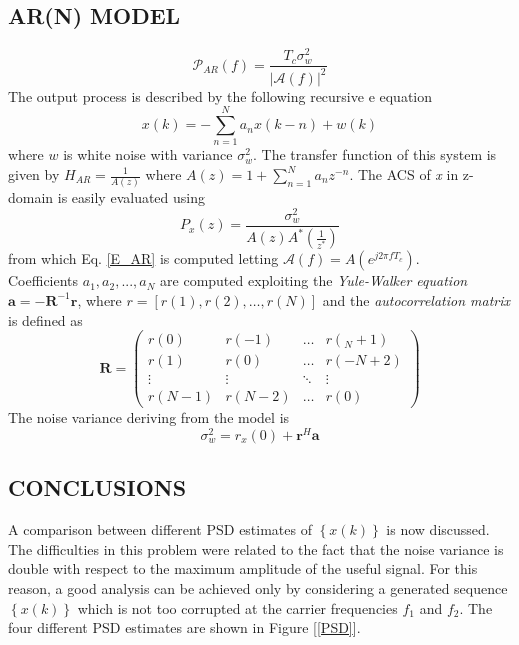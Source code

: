 \documentclass[a4paper,11pt,openright,twoside]{report}
\begin{document}
\subsection*{AR(N) MODEL}
\begin{equation}\label{E_AR}
\mathcal{P}_{AR}(f) = \frac{T_c \sigma_w^2}{\left | \mathcal{A}(f) \right |^2}
\end{equation}
The output process is described by the following recursive e equation
\begin{equation}\label{coeff}
x(k) = -\sum_{n=1}^{N} a_nx(k-n)+w(k)
\end{equation}
where $w$ is white noise with variance $\sigma_w^2$. The transfer function of this system is given by
$ H_{AR} = \frac{1}{A(z)} $ where $ A(z) = 1+\sum_{n=1}^Na_nz^{-n}$. The ACS of \textit{x} in z-domain is easily evaluated using 
\begin{equation*}
P_x(z) = \frac{\sigma_w^2}{A(z)A^*(\frac{1}{z^*})}
\end{equation*}
from which Eq. \ref{E_AR} is computed letting $\mathcal{A}(f) = A(e^{j2\pi f T_c})$. \\
Coefficients $a_1,a_2,...,a_N$ are computed exploiting the \textit{Yule-Walker equation}
 $\mathbf{a} = -\mathbf{R}^{-1}\mathbf{r}$, where $ r = \left[ r(1),r(2), \dots, r(N) \right] $ and the \textit{autocorrelation matrix} is defined as
\begin{equation*}
\mathbf{R} = \begin{pmatrix}
    r(0) & r(-1) & \dots & r(_N+1) \\
    r(1) & r(0) & \dots & r(-N+2) \\
    \vdots & \vdots & \ddots & \vdots \\
    r(N-1) & r(N-2) &  \dots & r(0)
    \end{pmatrix}
\end{equation*}
The noise variance deriving from the model is 
\begin{equation}\label{sigmaw}
\sigma_w^2 = r_x(0) + \mathbf{r}^H\mathbf{a}
\end{equation}

\subsection*{CONCLUSIONS}
A comparison between different PSD estimates of $ \left\lbrace x(k) \right\rbrace$ is now discussed. The difficulties in this problem were related to the fact that the noise variance is double with respect to the maximum amplitude of the useful signal. For this reason, a good analysis can be achieved only by considering a generated sequence $ \left\lbrace x(k) \right\rbrace$ which is not too corrupted at the carrier frequencies $f_1$ and $f_2$. The four different PSD estimates are shown in Figure [\ref{PSD}]. \\
\end{document}

